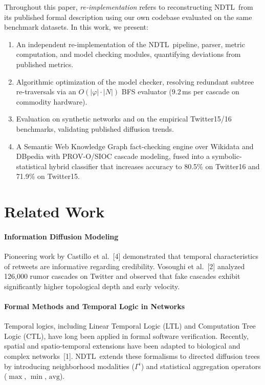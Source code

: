 \documentclass[10pt,twocolumn,a4paper]{article}
\newcommand{\NDTL}{\textsc{NDTL}}
\begin{document}
Throughout this paper, \emph{re-implementation} refers to reconstructing \NDTL\ from its published formal description using our own codebase evaluated on the same benchmark datasets. In this work, we present:
\begin{enumerate}
  \item An independent re-implementation of the \NDTL\ pipeline, parser, metric computation, and model checking modules, quantifying deviations from published metrics.
  \item Algorithmic optimization of the model checker, resolving redundant subtree re-traversals via an $O(|\varphi| \cdot |N|)$ BFS evaluator ($9.2$\,ms per cascade on commodity hardware).
  \item Evaluation on synthetic networks and on the empirical Twitter15/16 benchmarks, validating published diffusion trends.
  \item A Semantic Web Knowledge Graph fact-checking engine over Wikidata and DBpedia with PROV-O/SIOC cascade modeling, fused into a symbolic-statistical hybrid classifier that increases accuracy to 80.5\% on Twitter16 and 71.9\% on Twitter15.
\end{enumerate}
 
\section{Related Work}
\paragraph{Information Diffusion Modeling}
Pioneering work by Castillo et al.~[4] demonstrated that temporal characteristics of retweets are informative regarding credibility. Vosoughi et al.~[2] analyzed 126,000 rumor cascades on Twitter and observed that fake cascades exhibit significantly higher topological depth and early velocity.
 
\paragraph{Formal Methods and Temporal Logic in Networks}
Temporal logics, including Linear Temporal Logic (LTL) and Computation Tree Logic (CTL), have long been applied in formal software verification. Recently, spatial and spatio-temporal extensions have been adapted to biological and complex networks~[1]. \NDTL\ extends these formalisms to directed diffusion trees by introducing neighborhood modalities ($\Gamma^i$) and statistical aggregation operators ($\max$, $\min$, $\mathrm{avg}$).
 
\end{document}

